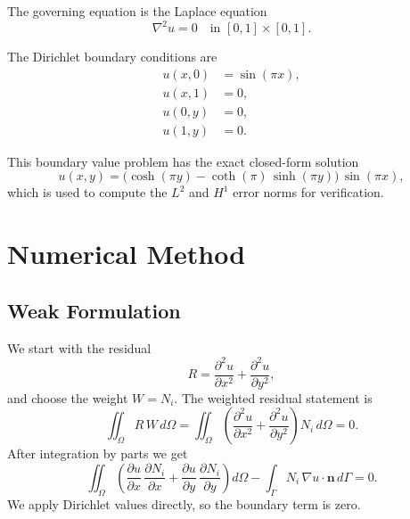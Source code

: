 \documentclass[12pt]{article}
\begin{document}
The governing equation is the Laplace equation
\begin{equation}
\nabla^2 u = 0 \quad \text{in } [0,1] \times [0,1].
\end{equation}

The Dirichlet boundary conditions are
\begin{align}
u(x,0) &= \sin(\pi x), \\
u(x,1) &= 0, \\
u(0,y) &= 0, \\
u(1,y) &= 0.
\end{align}

This boundary value problem has the exact closed-form solution
\begin{equation}
u(x,y) = \big(\cosh(\pi y) - \coth(\pi)\,\sinh(\pi y)\big)\,\sin(\pi x),
\end{equation}
which is used to compute the $L^2$ and $H^1$ error norms for verification.

\clearpage
\section{Numerical Method}
\subsection{Weak Formulation}
We start with the residual
\begin{equation}
R = \frac{\partial^2 u}{\partial x^2} + \frac{\partial^2 u}{\partial y^2},
\end{equation}
and choose the weight $W = N_i$. The weighted residual statement is
\begin{equation}
\iint_{\Omega} R\, W\, d\Omega = \iint_{\Omega} \left( \frac{\partial^2 u}{\partial x^2} + \frac{\partial^2 u}{\partial y^2} \right) N_i\, d\Omega = 0.
\end{equation}
After integration by parts we get
\begin{equation}
\iint_{\Omega} \left( \frac{\partial u}{\partial x}\, \frac{\partial N_i}{\partial x} + \frac{\partial u}{\partial y}\, \frac{\partial N_i}{\partial y} \right) d\Omega
- \int_{\Gamma} N_i\, \nabla u \cdot \mathbf{n}\, d\Gamma = 0.
\end{equation}
We apply Dirichlet values directly, so the boundary term is zero.
\end{document}
